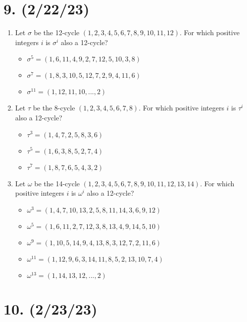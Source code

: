 \documentclass{article}
\begin{document}
\section*{9. (2/22/23)}

\begin{enumerate}[label=(\alph*)]
    \item Let $\sigma$ be the 12-cycle $(1, 2, 3, 4, 5, 6, 7, 8, 9, 10, 11, 12)$. For which positive integers $i$ is $\sigma^i$ also a 12-cycle?
        \begin{itemize}
            \item $\sigma^5 = (1, 6, 11, 4, 9, 2, 7, 12, 5, 10, 3, 8)$
            \item $\sigma^7 = (1, 8, 3, 10, 5, 12, 7, 2, 9, 4, 11, 6)$
            \item $\sigma^11 = (1, 12, 11, 10, ..., 2)$
        \end{itemize}
    \item Let $\tau$ be the 8-cycle $(1, 2, 3, 4, 5, 6, 7, 8)$. For which positive integers $i$ is $\tau^i$ also a 12-cycle?
        \begin{itemize}
            \item $\tau^3 = (1, 4, 7, 2, 5, 8, 3, 6)$
            \item $\tau^5 = (1, 6, 3, 8, 5, 2, 7, 4)$
            \item $\tau^7 = (1, 8, 7, 6, 5, 4, 3, 2)$
        \end{itemize}
    \item Let $\omega$ be the 14-cycle $(1, 2, 3, 4, 5, 6, 7, 8, 9, 10, 11, 12, 13, 14)$. For which positive integers $i$ is $\omega^i$ also a 12-cycle?
        \begin{itemize}
            \item $\omega^3 = (1, 4, 7, 10, 13, 2, 5, 8, 11, 14, 3, 6, 9, 12)$
            \item $\omega^5 = (1, 6, 11, 2, 7, 12, 3, 8, 13, 4, 9, 14, 5, 10)$
            \item $\omega^9 = (1, 10, 5, 14, 9, 4, 13, 8, 3, 12, 7, 2, 11, 6)$
            \item $\omega^{11} = (1, 12, 9, 6, 3, 14, 11, 8, 5, 2, 13, 10, 7, 4)$
            \item $\omega^{13} = (1, 14, 13, 12, ..., 2)$
        \end{itemize}
\end{enumerate}

\section*{10. (2/23/23)}
\end{document}
